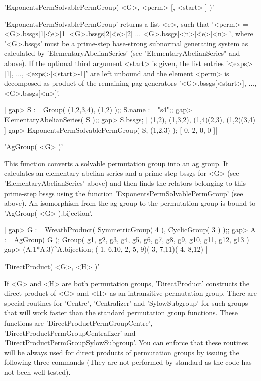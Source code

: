 \vspace{5mm}
'ExponentsPermSolvablePermGroup( <G>, <perm> [, <start> ] )'%

'ExponentsPermSolvablePermGroup' returns a  list <e>, such that '<perm> =
<G>.bssgs[1]\^<e>[1]   {\*}    <G>.bssgs[2]\^<e>[2]   {\*}    ...    {\*}
<G>.bssgs[<n>]\^<e>[<n>]',  where  '<G>.bssgs'  must   be   a  prime-step
base-strong    subnormal    generating    system    as   calculated    by
'ElementaryAbelianSeries' (see "ElementaryAbelianSeries"  and above).  If
the   optional  third  argument  <start>  is  given,   the  list  entries
'<exps>[1],  ...,  <exps>[<start>-1]'  are  left  unbound and the element
<perm>  is  decomposed  as  product  of  the  remaining   pag  generators
'<G>.bssgs[<start>], ..., <G>.bssgs[<n>]'.

|    gap> S := Group( (1,2,3,4), (1,2) );; S.name := "s4";;
    gap> ElementaryAbelianSeries( S );;
    gap> S.bssgs;
    [ (1,2), (1,3,2), (1,4)(2,3), (1,2)(3,4) ]
    gap> ExponentsPermSolvablePermGroup( S, (1,2,3) );
    [ 0, 2, 0, 0 ]|

\vspace{5mm}
'AgGroup( <G> )'%

This function converts a solvable permutation group into an ag group.  It
calculates an elementary abelian  series  and a prime-step  bssgs for <G>
(see  'ElementaryAbelianSeries'  above)  and  then  finds  the   relators
belonging    to    this    prime-step    bssgs   using    the    function
'ExponentsPermSolvablePermGroup' (see above).  An isomorphism from the ag
group to the permutation group is bound to 'AgGroup( <G> ).bijection'.

|    gap> G := WreathProduct( SymmetricGroup( 4 ), CyclicGroup( 3 ) );;
    gap> A := AgGroup( G );
    Group( g1, g2, g3, g4, g5, g6, g7, g8, g9, g10, g11, g12, g13 )
    gap> (A.1*A.3)^A.bijection;
    ( 1, 6,10, 2, 5, 9)( 3, 7,11)( 4, 8,12) |

\vspace{5mm}
'DirectProduct( <G>, <H> )'%

If <G> and <H> are both permutation groups, 'DirectProduct' constructs the
direct product of <G> and <H> as an intransitive permutation group. There are
special routines for 'Centre', 'Centralizer' and 'SylowSubgroup' for such
groups that will work faster than the standard permutation group functions.
These functions are 'DirectProductPermGroupCentre',
'DirectProductPermGroupCentralizer' and 'DirectProductPermGroupSylowSubgroup'.
You can enforce that these routines will be always used for direct products
of permutation groups by issuing the following three commands (They are not
performed by standard as the code has not been well-tested).

